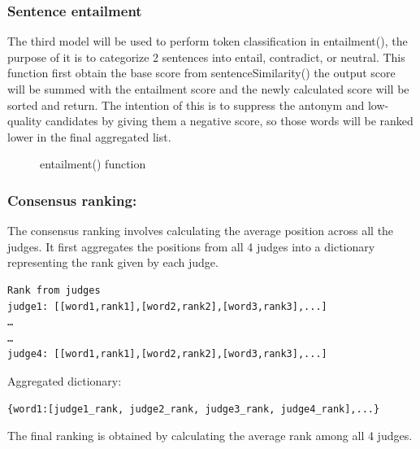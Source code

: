 \documentclass[12pt,oneside,openright,a4paper]{cpe-english-project}
\begin{document}
\subsubsection{Sentence entailment}
The third model will be used to perform token classification in entailment(), the purpose of it is to categorize 2 sentences into entail, contradict, or neutral. 
This function first obtain the base score from sentenceSimilarity() the output score will be summed with the entailment score and the newly calculated score will be sorted and return. The intention of this is to suppress the antonym and low-quality candidates by giving them a negative score, so those words will be ranked lower in the final aggregated list.
\begin{figure}[!h]\centering
\setlength{\fboxrule}{0.2mm} %
\setlength{\fboxsep}{1cm}
\caption{entailment() function}\label{fig:entailment() function}
\end{figure}






\subsubsection{ Consensus ranking:}

The consensus ranking involves calculating the average position across all the judges. It first aggregates the positions from all 4 judges into a dictionary representing the rank given by each judge. 
\begin{verbatim}
Rank from judges
judge1: [[word1,rank1],[word2,rank2],[word3,rank3],...]
…
…
judge4: [[word1,rank1],[word2,rank2],[word3,rank3],...]

\end{verbatim}
Aggregated dictionary: 
\begin{verbatim}
{word1:[judge1_rank, judge2_rank, judge3_rank, judge4_rank],...}
\end{verbatim}
The final ranking is obtained by calculating the average rank among all 4 judges.
\end{document}
